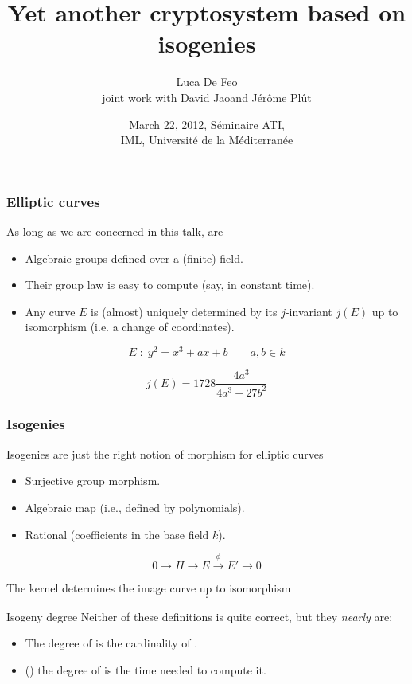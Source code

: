 \documentclass{beamer}
\title{Yet another cryptosystem based on isogenies}
\author[Luca De Feo]{Luca De Feo\footnotemark[1]\\
  joint work with David Jao\footnotemark[2] and Jérôme Plût\footnotemark[1]}
\date[Marseilles, March 22, 2012]{March 22, 2012, Séminaire ATI,\\
  IML, Université de la Méditerranée}
\institute[UVSQ]{\footnotemark[1]Université de Versailles -- Saint-Quentin-en-Yvelines,\\
  \footnotemark[2]University of Waterloo}
\renewcommand{\emph}[1]{}
\begin{document}
\frame{\titlepage}


\begin{frame}
  \frametitle{Elliptic curves}

  As long as we are concerned in this talk, \emph{elliptic curves} are

  \begin{itemize}
  \item Algebraic \alert{groups} defined over a (finite) field.
  \item Their group law is easy to compute (say, in constant time).
  \item Any curve $E$ is (almost) uniquely determined by its
    \alert{$j$-invariant} $j(E)$ up to isomorphism (i.e. a change of
    coordinates).
  \end{itemize}
  
  \[E \;:\; y^2 = x^3 + ax + b \qquad a,b\in k\]

  \alert{\[j(E) = 1728\frac{4a^3}{4a^3+27b^2}\]}
  
\end{frame}


\begin{frame}
  \frametitle{Isogenies}

  Isogenies are just \alert{the right notion of morphism} for elliptic
  curves

  \begin{itemize}
  \item Surjective group morphism.
  \item Algebraic map (i.e., defined by polynomials).
  \item Rational (coefficients in the base field $k$).
  \end{itemize}

  \alert{\[0 \to H \to E \overset{\phi}{\to} E' \to 0\]}

  The kernel \emph{$H$} determines the image curve \emph{$E'$} up to
  isomorphism \[\emph{E/H\overset{\text{\tiny def}}{=}E'}.\]

  \begin{block}{Isogeny degree}
    Neither of these definitions is quite correct, but they
    \textit{nearly} are:
    \begin{itemize}
    \item The degree of \emph{$\phi$} is the cardinality of \emph{$\ker\phi$}.
    \item (\emph{Bisson}) the degree of \emph{$\phi$} is the time
      needed to compute it.
    \end{itemize}
  \end{block}
\end{frame}
\end{document}
